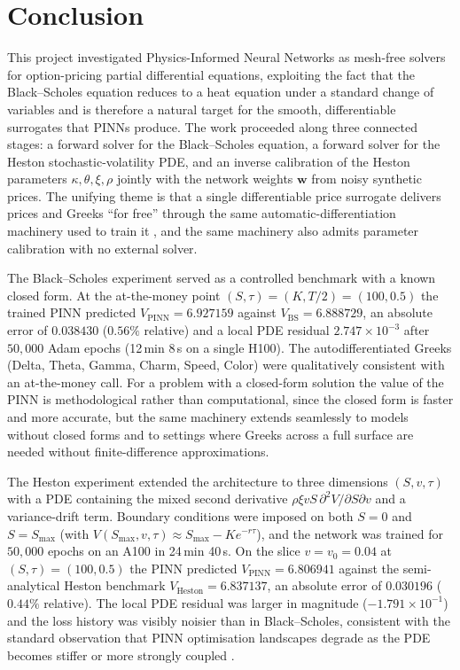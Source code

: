 \section{Conclusion}\label{section:conclusion}

This project investigated Physics-Informed Neural Networks as mesh-free solvers for option-pricing partial differential equations, exploiting the fact that the Black--Scholes equation reduces to a heat equation under a standard change of variables and is therefore a natural target for the smooth, differentiable surrogates that PINNs produce. The work proceeded along three connected stages: a forward solver for the Black--Scholes equation, a forward solver for the Heston stochastic-volatility PDE, and an inverse calibration of the Heston parameters $\kappa,\theta,\xi,\rho$ jointly with the network weights $\boldsymbol{w}$ from noisy synthetic prices. The unifying theme is that a single differentiable price surrogate delivers prices and Greeks ``for free'' through the same automatic-differentiation machinery used to train it \parencite{baydin2018automatic,karniadakis2021physics}, and the same machinery also admits parameter calibration with no external solver.

The Black--Scholes experiment served as a controlled benchmark with a known closed form. At the at-the-money point $(S,\tau)=(K,T/2)=(100,0.5)$ the trained PINN predicted $V_{\mathrm{PINN}}=6.927159$ against $V_{\mathrm{BS}}=6.888729$, an absolute error of $0.038430$ ($0.56\%$ relative) and a local PDE residual $2.747\times 10^{-3}$ after $50{,}000$ Adam epochs (12\,min 8\,s on a single H100). The autodifferentiated Greeks (Delta, Theta, Gamma, Charm, Speed, Color) were qualitatively consistent with an at-the-money call. For a problem with a closed-form solution the value of the PINN is methodological rather than computational, since the closed form is faster and more accurate, but the same machinery extends seamlessly to models without closed forms and to settings where Greeks across a full surface are needed without finite-difference approximations.

The Heston experiment extended the architecture to three dimensions $(S,v,\tau)$ with a PDE containing the mixed second derivative $\rho\xi vS\,\partial^2 V/\partial S\partial v$ and a variance-drift term. Boundary conditions were imposed on both $S=0$ and $S=S_{\max}$ (with $V(S_{\max},v,\tau)\approx S_{\max}-Ke^{-r\tau}$), and the network was trained for $50{,}000$ epochs on an A100 in 24\,min 40\,s. On the slice $v=v_0=0.04$ at $(S,\tau)=(100,0.5)$ the PINN predicted $V_{\mathrm{PINN}}=6.806941$ against the semi-analytical Heston benchmark $V_{\mathrm{Heston}}=6.837137$, an absolute error of $0.030196$ ($0.44\%$ relative). The local PDE residual was larger in magnitude ($-1.791\times 10^{-1}$) and the loss history was visibly noisier than in Black--Scholes, consistent with the standard observation that PINN optimisation landscapes degrade as the PDE becomes stiffer or more strongly coupled \parencite{wang2021understanding,wang2022expert,krishnapriyan2021characterizing}.

